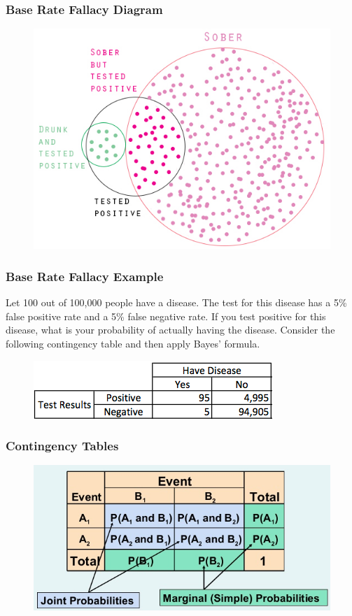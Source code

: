 \documentclass[xcolor=dvipsnames]{beamer}
\begin{document}
\begin{frame}
  \frametitle{Base Rate Fallacy Diagram}
\begin{figure}[h]
\includegraphics[scale=.4]{./diagrams/Detect-drunk-driving.jpg}
\end{figure}
\end{frame}

\begin{frame}
  \frametitle{Base Rate Fallacy Example}
  Let 100 out of 100,000 people have a disease. The test for this
  disease has a 5\% \alert{false positive} rate and a 5\% \alert{false
    negative} rate. If you test positive for this disease, what is
  your probability of actually having the disease. Consider the
  following \alert{contingency table} and then apply Bayes'
  formula.
\begin{figure}[h]
\includegraphics[scale=.7]{./diagrams/baserate3.png}
\end{figure}
\end{frame}

\begin{frame}
  \frametitle{Contingency Tables}
\begin{figure}[h]
\includegraphics[scale=.5]{./diagrams/contingency1.png}
\end{figure}
\end{frame}
\end{document}

